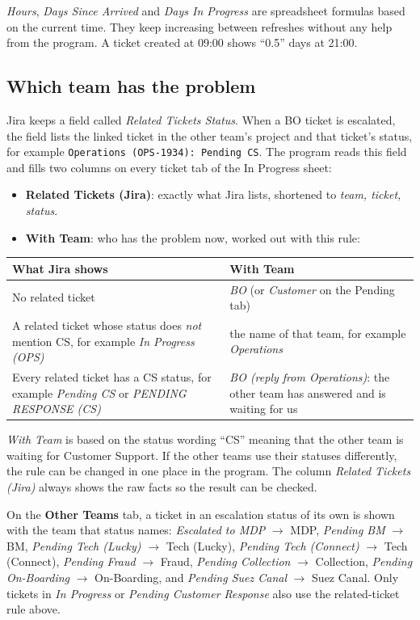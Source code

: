 \documentclass[11pt,a4paper]{article}
\newcommand{\code}[1]{\texttt{#1}}
\newcommand{\tab}[1]{\textbf{#1}}
\let\oldsubsection\subsection
\renewcommand{\subsection}{\needspace{7\baselineskip}\oldsubsection}
\begin{document}
\begin{note}
\emph{Hours}, \emph{Days Since Arrived} and \emph{Days In Progress} are spreadsheet formulas based on the current
time. They keep increasing between refreshes without any help from the program. A ticket created at 09:00 shows
``0.5'' days at 21:00.
\end{note}

\subsection{Which team has the problem}
\label{sec:withteam}
Jira keeps a field called \emph{Related Tickets Status}. When a BO ticket is escalated, the field lists the linked ticket
in the other team's project and that ticket's status, for example
\code{Operations (OPS-1934): Pending CS}. The program reads this field and fills two columns on every ticket tab of the
In Progress sheet:
\begin{itemize}
  \item \textbf{Related Tickets (Jira)}: exactly what Jira lists, shortened to \emph{team, ticket, status}.
  \item \textbf{With Team}: who has the problem now, worked out with this rule:
\end{itemize}
\begin{tabularx}{\linewidth}{@{}L L@{}}
\toprule
\textbf{What Jira shows} & \textbf{With Team} \\
\midrule
No related ticket & \emph{BO} (or \emph{Customer} on the Pending tab) \\
A related ticket whose status does \emph{not} mention CS, for example \emph{In Progress (OPS)} & the name of that
team, for example \emph{Operations} \\
Every related ticket has a CS status, for example \emph{Pending CS} or \emph{PENDING RESPONSE (CS)} &
\emph{BO (reply from Operations)}: the other team has answered and is waiting for us \\
\bottomrule
\end{tabularx}

\begin{warning}
\emph{With Team} is based on the status wording ``CS'' meaning that the other team is waiting for Customer Support. If
the other teams use their statuses differently, the rule can be changed in one place in the program. The column
\emph{Related Tickets (Jira)} always shows the raw facts so the result can be checked.
\end{warning}
On the \tab{Other Teams} tab, a ticket in an escalation status of its own is shown with the team that status names:
\emph{Escalated to MDP} $\rightarrow$ MDP, \emph{Pending BM} $\rightarrow$ BM, \emph{Pending Tech (Lucky)} $\rightarrow$
Tech (Lucky), \emph{Pending Tech (Connect)} $\rightarrow$ Tech (Connect), \emph{Pending Fraud} $\rightarrow$ Fraud,
\emph{Pending Collection} $\rightarrow$ Collection, \emph{Pending On-Boarding} $\rightarrow$ On-Boarding, and
\emph{Pending Suez Canal} $\rightarrow$ Suez Canal. Only tickets in \emph{In Progress} or \emph{Pending Customer
Response} also use the related-ticket rule above.
\end{document}
